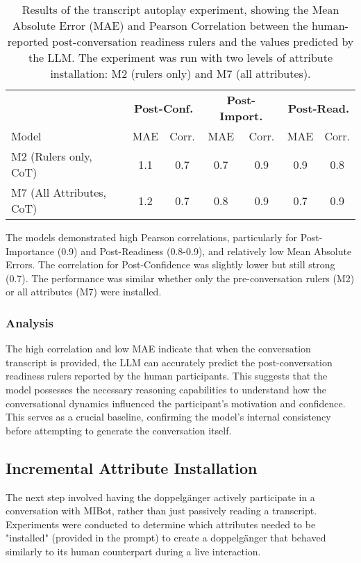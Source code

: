 \begin{table}[h]
\centering
\caption[Transcript Autoplay Experiment Results]{Results of the transcript autoplay experiment, showing the Mean Absolute Error (MAE) and Pearson Correlation between the human-reported post-conversation readiness rulers and the values predicted by the LLM. The experiment was run with two levels of attribute installation: M2 (rulers only) and M7 (all attributes).}
\label{tab:autoplay_results}
\begin{tabular}{|l|cc|cc|cc|}
\hline
 & \multicolumn{2}{c|}{\textbf{Post-Conf.}} & \multicolumn{2}{c|}{\textbf{Post-Import.}} & \multicolumn{2}{c|}{\textbf{Post-Read.}} \\
Model & MAE & Corr. & MAE & Corr. & MAE & Corr. \\ \hline
M2 (Rulers only, CoT) & 1.1 & 0.7 & 0.7 & 0.9 & 0.9 & 0.8 \\
M7 (All Attributes, CoT) & 1.2 & 0.7 & 0.8 & 0.9 & 0.7 & 0.9 \\ \hline
\end{tabular}
\end{table}

The models demonstrated high Pearson correlations, particularly for Post-Importance (0.9) and Post-Readiness (0.8-0.9), and relatively low Mean Absolute Errors. The correlation for Post-Confidence was slightly lower but still strong (0.7). The performance was similar whether only the pre-conversation rulers (M2) or all attributes (M7) were installed.

\subsubsection{Analysis}

The high correlation and low MAE indicate that when the conversation transcript is provided, the LLM can accurately predict the post-conversation readiness rulers reported by the human participants. This suggests that the model possesses the necessary reasoning capabilities to understand how the conversational dynamics influenced the participant's motivation and confidence. This serves as a crucial baseline, confirming the model's internal consistency before attempting to generate the conversation itself.

\subsection{Incremental Attribute Installation}

The next step involved having the doppelgänger actively participate in a conversation with MIBot, rather than just passively reading a transcript. Experiments were conducted to determine which attributes needed to be "installed" (provided in the prompt) to create a doppelgänger that behaved similarly to its human counterpart during a live interaction.


